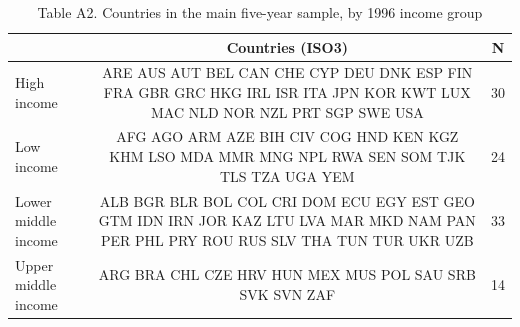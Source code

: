 \begin{table}[htbp]\centering\footnotesize
\providecommand{\sym}[1]{\ensuremath{^{#1}}}
\caption{Table A2. Countries in the main five-year sample, by 1996 income group}\label{tab:TableA2_countries}
\begin{tabular}{l*{2}{c}}
\toprule
 & Countries (ISO3) & N \\
\midrule
High income & ARE AUS AUT BEL CAN CHE CYP DEU DNK ESP FIN FRA GBR GRC HKG IRL ISR ITA JPN KOR KWT LUX MAC NLD NOR NZL PRT SGP SWE USA & 30 \\
Low income & AFG AGO ARM AZE BIH CIV COG HND KEN KGZ KHM LSO MDA MMR MNG NPL RWA SEN SOM TJK TLS TZA UGA YEM & 24 \\
Lower middle income & ALB BGR BLR BOL COL CRI DOM ECU EGY EST GEO GTM IDN IRN JOR KAZ LTU LVA MAR MKD NAM PAN PER PHL PRY ROU RUS SLV THA TUN TUR UKR UZB & 33 \\
Upper middle income & ARG BRA CHL CZE HRV HUN MEX MUS POL SAU SRB SVK SVN ZAF & 14 \\
\bottomrule
\end{tabular}
\end{table}
